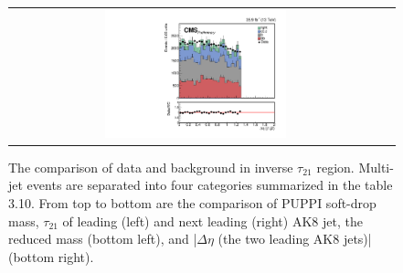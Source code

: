 \begin{figure}[t]
\begin{tabular}{cc}
    \includegraphics[width=0.5\textwidth]{Figures/dataMC_trig_antiTau21/deltaEta.pdf} \\
  \end{tabular}
  \caption{The comparison of data and background in inverse $\tau _{21}$ region. Multi-jet events are separated into four categories summarized in the table 3.10. From top to bottom are the comparison of PUPPI soft-drop mass, $\tau _{21}$ of leading (left) and next leading (right) AK8 jet, the reduced mass (bottom left), and |$\Delta \eta $ (the two leading AK8 jets)| (bottom right).}
  \label{fig:hvt_brs}
\end{figure}

